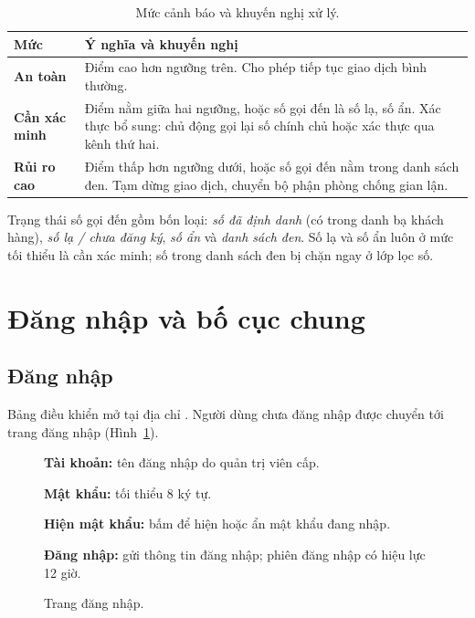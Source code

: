 \documentclass[11pt]{article}
\begin{document}
\begin{table}[tbp]
  \centering\small
  \caption{Mức cảnh báo và khuyến nghị xử lý.}
  \label{tab:levels}
  \begin{tabularx}{\linewidth}{@{}>{\raggedright\arraybackslash}p{2.6cm}X@{}}
    \toprule
    \textbf{Mức} & \textbf{Ý nghĩa và khuyến nghị} \\
    \midrule
    \textcolor{green!45!black}{\textbf{An toàn}} & Điểm cao hơn ngưỡng trên. Cho phép tiếp tục giao dịch bình thường. \\
    \textcolor{orange!85!black}{\textbf{Cần xác minh}} & Điểm nằm giữa hai ngưỡng, hoặc số gọi đến là số lạ, số ẩn. Xác thực bổ sung: chủ động gọi lại số chính chủ hoặc xác thực qua kênh thứ hai. \\
    \textcolor{annred}{\textbf{Rủi ro cao}} & Điểm thấp hơn ngưỡng dưới, hoặc số gọi đến nằm trong danh sách đen. Tạm dừng giao dịch, chuyển bộ phận phòng chống gian lận. \\
    \bottomrule
  \end{tabularx}
\end{table}

Trạng thái số gọi đến gồm bốn loại: \emph{số đã định danh} (có trong danh bạ khách hàng), \emph{số lạ / chưa đăng ký}, \emph{số ẩn} và \emph{danh sách đen}. Số lạ và số ẩn luôn ở mức tối thiểu là cần xác minh; số trong danh sách đen bị chặn ngay ở lớp lọc số.

\section{Đăng nhập và bố cục chung}

\subsection{Đăng nhập}

Bảng điều khiển mở tại địa chỉ . Người dùng chưa đăng nhập được chuyển tới trang đăng nhập (Hình~\ref{fig:login}).

\begin{figure}[tbp]
  \centering
  \caption{Trang đăng nhập.}
  \label{fig:login}
  \begin{flushleft}\small
\begin{legend}
  \item \textbf{Tài khoản:} tên đăng nhập do quản trị viên cấp.
  \item \textbf{Mật khẩu:} tối thiểu 8 ký tự.
  \item \textbf{Hiện mật khẩu:} bấm để hiện hoặc ẩn mật khẩu đang nhập.
  \item \textbf{Đăng nhập:} gửi thông tin đăng nhập; phiên đăng nhập có hiệu lực 12 giờ.
\end{legend}
  \end{flushleft}
\end{figure}
\end{document}

